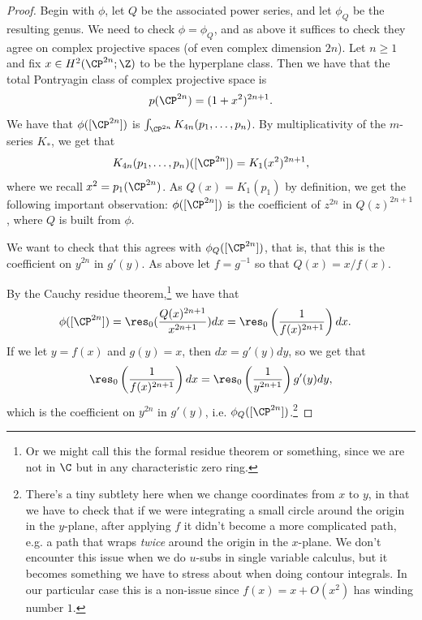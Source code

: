 \documentclass[11pt]{book}
\begin{document}
\begin{proof} Begin with $\phi$, let $Q$ be the associated power series, and let $\phi_Q$ be the resulting genus. We need to check $\phi = \phi_Q$, and as above it suffices to check they agree on complex projective spaces (of even complex dimension $2n$). Let $n\ge1$ and fix $x\in H^2(\CP^{2n};\Z)$ to be the hyperplane class. Then we have that the total Pontryagin class of complex projective space is
\begin{align*}
    p(\CP^{2n}) = (1+x^2)^{2n+1}.
\end{align*}
We have that $\phi([\CP^{2n}])$ is $\int_{\CP^{2n}} K_{4n}(p_1, \ldots, p_n)$. By multiplicativity of the $m$-series $K_\ast$, we get that
\begin{align*}
    K_{4n}(p_1, \ldots, p_n)([\CP^{2n}]) = K_1(x^2)^{2n+1},
\end{align*}
where we recall $x^2 = p_1(\CP^{2n})$. As $Q(x) = K_1(p_1)$ by definition, we get the following important observation: $\phi([\CP^{2n}])$ is the coefficient of $z^{2n}$ in $Q(z)^{2n+1}$, where $Q$ is built from $\phi$.

We want to check that this agrees with $\phi_Q([\CP^{2n}])$, that is, that this is the coefficient on $y^{2n}$ in $g'(y)$. As above let $f = g^{-1}$ so that $Q(x) = x/f(x)$.

By the Cauchy residue theorem,\footnote{Or we might call this the formal residue theorem or something, since we are not in $\C$ but in any characteristic zero ring.} we have that
\begin{align*}
    \phi([\CP^{2n}]) &= \res_0(\frac{Q(x)^{2n+1}}{x^{2n+1}})dx = \res_0 \left( \frac{1}{f(x)^{2n+1}} \right)dx.
\end{align*}
If we let $y=f(x)$ and $g(y)=x$, then $dx = g'(y)dy$, so we get that
\begin{align*}
    \res_0 \left( \frac{1}{f(x)^{2n+1}} \right)dx = \res_0 \left( \frac{1}{y^{2n+1}} \right)g'(y)dy,
\end{align*}
which is the coefficient on $y^{2n}$ in $g'(y)$, i.e. $\phi_Q([\CP^{2n}])$.\footnote{There's a tiny subtlety here when we change coordinates from $x$ to $y$, in that we have to check that if we were integrating a small circle around the origin in the $y$-plane, after applying $f$ it didn't become a more complicated path, e.g. a path that wraps \emph{twice} around the origin in the $x$-plane. We don't encounter this issue when we do $u$-subs in single variable calculus, but it becomes something we have to stress about when doing contour integrals. In our particular case this is a non-issue since $f(x) = x + O(x^2)$ has winding number $1$.}
\end{proof}
\end{document}
